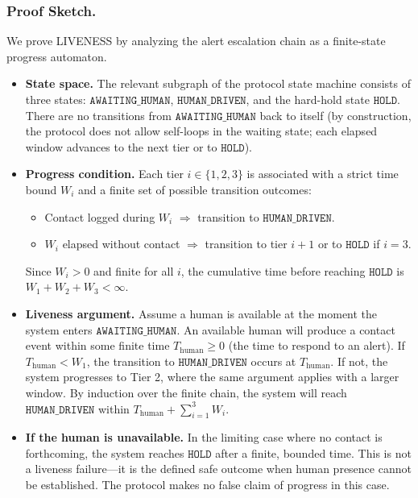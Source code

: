 \subsubsection*{Proof Sketch.}
We prove LIVENESS by analyzing the alert escalation chain as a finite-state progress automaton.

\begin{itemize}
    \item \textbf{State space.} The relevant subgraph of the protocol state machine consists of three states: $\texttt{AWAITING\_HUMAN}$, $\texttt{HUMAN\_DRIVEN}$, and the hard-hold state $\texttt{HOLD}$. There are no transitions from $\texttt{AWAITING\_HUMAN}$ back to itself (by construction, the protocol does not allow self-loops in the waiting state; each elapsed window advances to the next tier or to $\texttt{HOLD}$).
    \item \textbf{Progress condition.} Each tier $i \in \{1, 2, 3\}$ is associated with a strict time bound $W_i$ and a finite set of possible transition outcomes:
    \begin{itemize}
        \item Contact logged during $W_i$ $\Rightarrow$ transition to $\texttt{HUMAN\_DRIVEN}$.
        \item $W_i$ elapsed without contact $\Rightarrow$ transition to tier $i+1$ or to $\texttt{HOLD}$ if $i=3$.
    \end{itemize}
    Since $W_i > 0$ and finite for all $i$, the cumulative time before reaching $\texttt{HOLD}$ is $W_1 + W_2 + W_3 < \infty$.
    \item \textbf{Liveness argument.} Assume a human is available at the moment the system enters $\texttt{AWAITING\_HUMAN}$. An available human will produce a contact event within some finite time $T_{\text{human}} \geq 0$ (the time to respond to an alert). If $T_{\text{human}} < W_1$, the transition to $\texttt{HUMAN\_DRIVEN}$ occurs at $T_{\text{human}}$. If not, the system progresses to Tier 2, where the same argument applies with a larger window. By induction over the finite chain, the system will reach $\texttt{HUMAN\_DRIVEN}$ within $T_{\text{human}} + \sum_{i=1}^{3} W_i$.
    \item \textbf{If the human is unavailable.} In the limiting case where no contact is forthcoming, the system reaches $\texttt{HOLD}$ after a finite, bounded time. This is not a liveness failure---it is the defined safe outcome when human presence cannot be established. The protocol makes no false claim of progress in this case.
\end{itemize}

